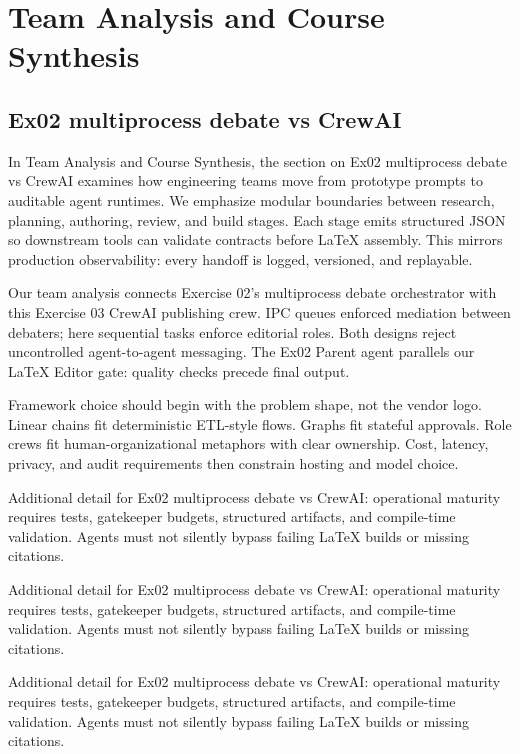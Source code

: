 \section{Team Analysis and Course Synthesis}

\subsection{Ex02 multiprocess debate vs CrewAI}
In Team Analysis and Course Synthesis, the section on Ex02 multiprocess debate vs CrewAI examines how engineering teams move from prototype prompts to auditable agent runtimes. We emphasize modular boundaries between research, planning, authoring, review, and build stages. Each stage emits structured JSON so downstream tools can validate contracts before LaTeX assembly. This mirrors production observability: every handoff is logged, versioned, and replayable. \cite{crewai2024} \cite{langgraph2024}

Our team analysis connects Exercise 02's multiprocess debate orchestrator with this Exercise 03 CrewAI publishing crew. IPC queues enforced mediation between debaters; here sequential tasks enforce editorial roles. Both designs reject uncontrolled agent-to-agent messaging. The Ex02 Parent agent parallels our LaTeX Editor gate: quality checks precede final output. \cite{crewai2024} \cite{langgraph2024}

Framework choice should begin with the problem shape, not the vendor logo. Linear chains fit deterministic ETL-style flows. Graphs fit stateful approvals. Role crews fit human-organizational metaphors with clear ownership. Cost, latency, privacy, and audit requirements then constrain hosting and model choice. \cite{crewai2024} \cite{langgraph2024}

Additional detail for Ex02 multiprocess debate vs CrewAI: operational maturity requires tests, gatekeeper budgets, structured artifacts, and compile-time validation. Agents must not silently bypass failing LaTeX builds or missing citations. \cite{crewai2024} \cite{langgraph2024}

Additional detail for Ex02 multiprocess debate vs CrewAI: operational maturity requires tests, gatekeeper budgets, structured artifacts, and compile-time validation. Agents must not silently bypass failing LaTeX builds or missing citations. \cite{crewai2024} \cite{langgraph2024}

Additional detail for Ex02 multiprocess debate vs CrewAI: operational maturity requires tests, gatekeeper budgets, structured artifacts, and compile-time validation. Agents must not silently bypass failing LaTeX builds or missing citations. \cite{crewai2024} \cite{langgraph2024}

